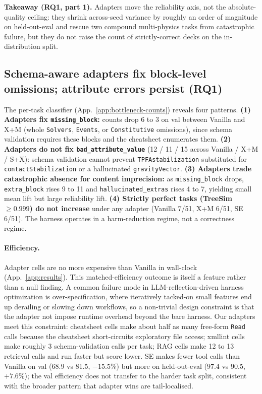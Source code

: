 \documentclass{article}
\begin{document}
\textbf{Takeaway (RQ1, part 1).} Adapters move the reliability axis, not the absolute-quality ceiling: they shrink across-seed variance by roughly an order of magnitude on held-out-eval and rescue two compound multi-physics tasks from catastrophic failure, but they do not raise the count of strictly-correct decks on the in-distribution split.

\subsection{Schema-aware adapters fix block-level omissions; attribute errors persist (RQ1)}
\label{subsec:bottleneck-results}

The per-task classifier (App.~\ref{app:bottleneck-counts}) reveals four patterns. \textbf{(1) Adapters fix \texttt{missing\_block}:} counts drop 6 to 3 on val between Vanilla and X+M (whole \texttt{Solvers}, \texttt{Events}, or \texttt{Constitutive} omissions), since schema validation requires these blocks and the cheatsheet enumerates them. \textbf{(2) Adapters do not fix \texttt{bad\_attribute\_value}} (12 / 11 / 15 across Vanilla / X+M / S+X): schema validation cannot prevent \texttt{TPFAstabilization} substituted for \texttt{contactStabilization} or a hallucinated \texttt{gravityVector}. \textbf{(3) Adapters trade catastrophic absence for content imprecision:} as \texttt{missing\_block} drops, \texttt{extra\_block} rises 9 to 11 and \texttt{hallucinated\_extras} rises 4 to 7, yielding small mean lift but large reliability lift. \textbf{(4) Strictly perfect tasks (TreeSim $\geq 0.999$) do not increase} under any adapter (Vanilla 7/51, X+M 6/51, SE 6/51). The harness operates in a harm-reduction regime, not a correctness regime.

\paragraph{Efficiency.}\label{subsec:efficiency} Adapter cells are no more expensive than Vanilla in wall-clock (App.~\ref{app:results}). This matched-efficiency outcome is itself a feature rather than a null finding. A common failure mode in LLM-reflection-driven harness optimization is over-specification, where iteratively tacked-on small features end up derailing or slowing down workflows, so a non-trivial design constraint is that the adapter not impose runtime overhead beyond the bare harness. Our adapters meet this constraint: cheatsheet cells make about half as many free-form \texttt{Read} calls because the cheatsheet short-circuits exploratory file access; xmllint cells make roughly 3 schema-validation calls per task; RAG cells make 12 to 13 retrieval calls and run faster but score lower. SE makes fewer tool calls than Vanilla on val (68.9 vs 81.5, ${-}15.5\%$) but more on held-out-eval (97.4 vs 90.5, $+7.6\%$); the val efficiency does not transfer to the harder task split, consistent with the broader pattern that adapter wins are tail-localised.
\end{document}
